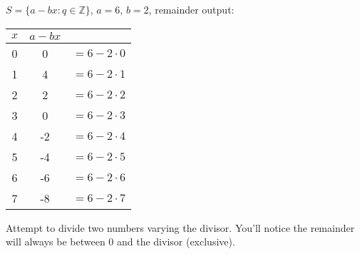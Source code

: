 \begin{center}
    $S=\{a-bx:q\in\mathbb{Z}\}$, $a=6$, $b=2$, remainder output:
\end{center}
\begin{center}
    \begin{tabular}{c|cc}
        $x$ & $a-bx$                \\
        \hline
        0   & 0      & $=6-2\cdot0$ \\
        1   & 4      & $=6-2\cdot1$ \\
        2   & 2      & $=6-2\cdot2$ \\
        3   & 0      & $=6-2\cdot3$ \\
        \hline
        4   & -2     & $=6-2\cdot4$ \\
        5   & -4     & $=6-2\cdot5$ \\
        6   & -6     & $=6-2\cdot6$ \\
        7   & -8     & $=6-2\cdot7$ \\
    \end{tabular}
\end{center}

\noindent
Attempt to divide two numbers varying the divisor.
You'll notice the remainder will always be between 0 and the divisor (exclusive).



\noindent






